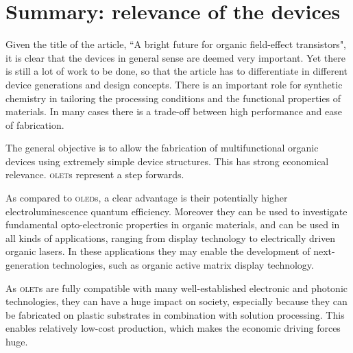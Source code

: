 \section{Summary: relevance of the devices}

Given the title of the article, ``A bright future for organic field-effect transistors", it is clear that the devices in general sense are deemed very important. Yet there is still a lot of work to be done, so that the article has to differentiate in different device generations and design concepts. There is an important role for synthetic chemistry in tailoring the processing conditions and the functional properties of materials. In many cases there is a trade-off between high performance and ease of fabrication.

The general objective is to allow the fabrication of multifunctional organic devices using extremely simple device structures. This has strong economical relevance. \textsc{olet}s represent a step forwards.

As compared to \textsc{oled}s, a clear advantage is their potentially higher electroluminescence quantum efficiency. Moreover they can be used to investigate fundamental opto-electronic properties in organic materials, and can be used in all kinds of applications, ranging from display technology to electrically driven organic lasers. In these applications they may enable the development of next-generation technologies, such as organic active matrix display technology.

As \textsc{olet}s are fully compatible with many well-established electronic and photonic technologies, they can have a huge impact on society, especially because they can be fabricated on plastic substrates in combination with solution processing. This enables relatively low-cost production, which makes the economic driving forces huge.